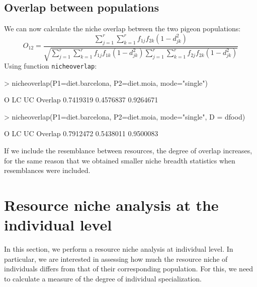 \documentclass[11pt,a4paper]{article}
\begin{document}
\subsection{Overlap between populations}
We can now calculate the niche overlap between the two pigeon populations:
\[
O_{12} = \frac{\sum_{j=1}^r\sum_{k=1}^r{f_{1j}f_{2k}(1-d_{jk}^2)}}{\sqrt{\sum_{j=1}^r\sum_{k=1}^r{f_{1j}f_{1k}(1-d_{jk}^2)}\sum_{j=1}^r\sum_{k=1}^r{f_{2j}f_{2k}(1-d_{jk}^2)}}}
\]
Using function \texttt{nicheoverlap}:
\begin{Schunk}
\begin{Sinput}
> nicheoverlap(P1=diet.barcelona, P2=diet.moia, mode="single")
\end{Sinput}
\begin{Soutput}
                O        LC        UC
Overlap 0.7419319 0.4576837 0.9264671
\end{Soutput}
\begin{Sinput}
> nicheoverlap(P1=diet.barcelona, P2=diet.moia, mode="single", D = dfood)
\end{Sinput}
\begin{Soutput}
                O        LC        UC
Overlap 0.7912472 0.5438011 0.9500083
\end{Soutput}
\end{Schunk}
If we include the resemblance between resources, the degree of overlap increases, for the same reason that we obtained smaller niche breadth statistics when resemblances were included.

\section{Resource niche analysis at the individual level}
In this section, we perform a resource niche analysis at individual level. In particular, we are interested in assessing how much the resource niche of individuals differs from that of their corresponding population. For this, we need to calculate a measure of the degree of individual specialization. 
\end{document}
